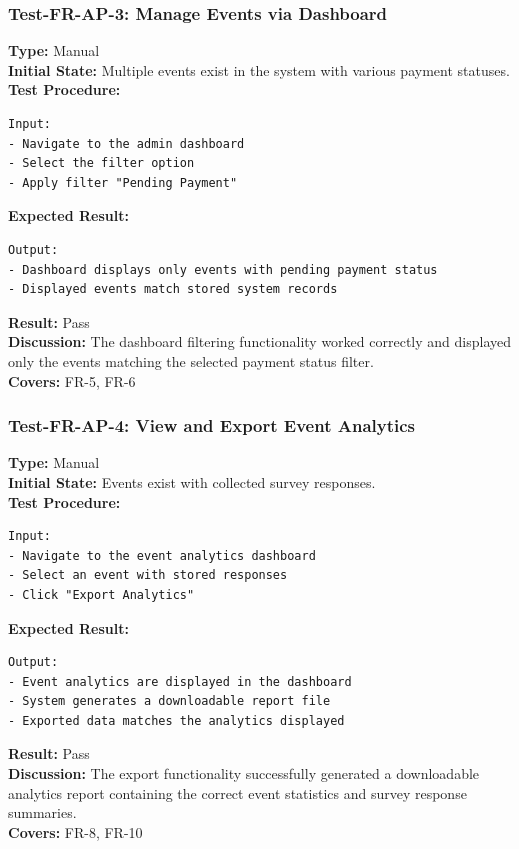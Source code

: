 \documentclass[12pt, titlepage]{article}
\begin{document}
\subsubsection{Test-FR-AP-3: Manage Events via Dashboard}
\textbf{Type:} Manual \\ \textbf{Initial State:} Multiple events exist in the system with various payment statuses. \\ \textbf{Test Procedure:}
\begin{verbatim}
Input:
- Navigate to the admin dashboard
- Select the filter option
- Apply filter "Pending Payment"
\end{verbatim}
\textbf{Expected Result:}
\begin{verbatim}
Output:
- Dashboard displays only events with pending payment status
- Displayed events match stored system records
\end{verbatim}
\textbf{Result:} Pass \\ \textbf{Discussion:} The dashboard filtering functionality worked correctly and displayed only the events matching the selected payment status filter. \\
\textbf{Covers:} FR-5, FR-6 \\

\subsubsection{Test-FR-AP-4: View and Export Event Analytics}
\textbf{Type:} Manual \\ \textbf{Initial State:} Events exist with collected survey responses. \\ \textbf{Test Procedure:}
\begin{verbatim}
Input:
- Navigate to the event analytics dashboard
- Select an event with stored responses
- Click "Export Analytics"
\end{verbatim}
\textbf{Expected Result:}
\begin{verbatim}
Output:
- Event analytics are displayed in the dashboard
- System generates a downloadable report file
- Exported data matches the analytics displayed
\end{verbatim}
\textbf{Result:} Pass \\ 
\textbf{Discussion:} The export functionality successfully generated a downloadable analytics report containing the correct event statistics and survey response summaries. \\
\textbf{Covers:} FR-8, FR-10 \\
\end{document}

